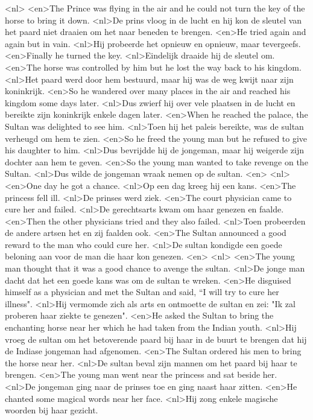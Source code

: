 <nl>
<en>The Prince was flying in the air and he could not turn the key of the horse to bring it down.
<nl>De prins vloog in de lucht en hij kon de sleutel van het paard niet draaien om het naar beneden te brengen.
<en>He tried again and again but in vain.
<nl>Hij probeerde het opnieuw en opnieuw, maar tevergeefs.
<en>Finally he turned the key.
<nl>Eindelijk draaide hij de sleutel om.
<en>The horse was controlled by him but he lost the way back to his kingdom.
<nl>Het paard werd door hem bestuurd, maar hij was de weg kwijt naar zijn koninkrijk.
<en>So he wandered over many places in the air and reached his kingdom some days later.
<nl>Dus zwierf hij over vele plaatsen in de lucht en bereikte  zijn koninkrijk enkele dagen later.
<en>When he reached the palace, the Sultan was delighted to see him.
<nl>Toen hij het paleis bereikte, was de sultan verheugd om hem te zien.
<en>So he freed the young man but he refused to give his daughter to him.
<nl>Dus bevrijdde hij de jongeman, maar hij weigerde zijn dochter aan hem te geven.
<en>So the young man wanted to take revenge on the Sultan.
<nl>Dus wilde de jongeman wraak nemen op de sultan.
<en>
<nl>
<en>One day he got a chance.
<nl>Op een dag kreeg hij een kans.
<en>The princess fell ill.
<nl>De prinses werd ziek.
<en>The court physician came to cure her and failed.
<nl>De gerechtsarts kwam om haar genezen en faalde.
<en>Then the other physicians tried and they also failed.
<nl>Toen probeerden de andere artsen het en zij faalden ook.
<en>The Sultan announced a good reward to the man who could cure her.
<nl>De sultan kondigde een goede beloning aan voor de man die haar kon genezen.
<en>
<nl>
<en>The young man thought that it was a good chance to avenge the sultan.
<nl>De jonge man dacht dat het een goede kans was om de sultan te wreken.
<en>He disguised himself as a physician and met the Sultan and said, “I will try to cure her illness".
<nl>Hij vermomde zich als arts en ontmoette de sultan en zei: "Ik zal proberen haar ziekte te genezen".
<en>He asked the Sultan to bring the enchanting horse near her which he had taken from the Indian youth.
<nl>Hij vroeg de sultan om het betoverende paard bij haar in de buurt te brengen dat hij de Indiase jongeman had afgenomen.
<en>The Sultan ordered his men to bring the horse near her.
<nl>De sultan beval zijn mannen om het paard bij haar te brengen.
<en>The young man went near the princess and sat beside her.
<nl>De jongeman ging naar de prinses toe en ging naast haar zitten.
<en>He chanted some magical words near her face.
<nl>Hij zong enkele magische woorden bij haar gezicht.
